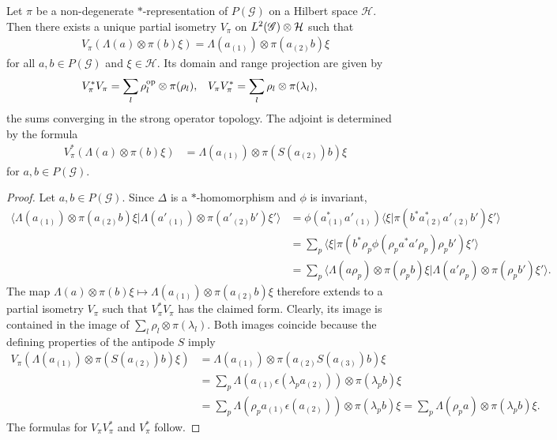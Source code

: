 \begin{Lem} \label{lemma:partial-isometry}
  Let  $\pi$ be a non-degenerate $*$-representation of
  $P(\mathscr{G})$ on a Hilbert space $\mathcal{H}$. Then there exists
  a unique partial isometry $V_{\pi}$ on $L^{2}(\mathscr{G}) \otimes \mathcal{H}$
  such that
  \begin{align*}
    V_{\pi}(\Lambda(a) \otimes \pi(b)\xi) = \Lambda(a_{(1)}) \otimes
    \pi(a_{(2)}b) \xi
  \end{align*}
  for all $a,b\in P(\mathscr{G})$ and $\xi \in \mathcal{H}$. Its
 domain and range projection are given by
\begin{align*}
  V_{\pi}^{*}V_{\pi} &= \sum_{l} \rho_{l}^{\operatorname{\mathrm{op}}} \otimes \pi(\rho_{l}), &
  V_{\pi}V_{\pi}^{*} &= \sum_{l}  \rho_{l} \otimes \pi(\lambda_{l}),
\end{align*}
  the sums converging in the strong operator topology. The adjoint is determined by the formula
\begin{align*}
V_{\pi}^{*}(\Lambda(a) \otimes \pi(b)\xi) &= \Lambda(a_{(1)}) \otimes
\pi(S(a_{(2)})b)\xi
\end{align*}
for $a,b\in P(\mathscr{G})$.
\end{Lem}
\begin{proof}
  Let $a,b \in P(\mathscr{G})$. Since $\Delta$ is a $*$-homomorphism and $\phi$ is
invariant,
  \begin{align*}
    \langle \Lambda(a_{(1)}) \otimes
    \pi(a_{(2)}b)\xi|\Lambda(a'_{(1)}) \otimes
    \pi(a'_{(2)}b')\xi'\rangle &=
    \phi(a_{(1)}^{*}a'_{(1)})\langle \xi|\pi(b^{*}a_{(2)}^{*}a'_{(2)}b')\xi'\rangle \\
    &= \sum_{p}
    \langle \xi|\pi(b^{*}\rho_{p}\phi(\rho_{p}a^{*}a'\rho_{p})\rho_{p}b')\xi'\rangle \\
    & =\sum_{p} \langle\Lambda(a\rho_{p}) \otimes \pi(\rho_{p}b)\xi |
    \Lambda(a'\rho_{p}) \otimes \pi(\rho_{p}b')\xi'\rangle.
  \end{align*}
  The map $\Lambda(a) \otimes \pi(b)\xi \mapsto \Lambda(a_{(1)})
  \otimes \pi(a_{(2)}b)\xi$ therefore extends to a partial isometry
  $V_{\pi}$ such that $V^{*}_{\pi}V_{\pi}$ has the claimed
  form. Clearly, its image is contained in the image of $\sum_{l}
  \rho_{l} \otimes \pi(\lambda_{l})$. Both images coincide
  because the defining properties of the antipode $S$
  imply 
 \begin{align*}
 V_{\pi}(\Lambda(a_{(1)}) \otimes \pi(S(a_{(2)})b)\xi)   &=
 \Lambda(a_{(1)}) \otimes \pi(a_{(2)}S(a_{(3)})b)\xi \\ &=  \sum_{p}\Lambda(a_{(1)}\epsilon(\lambda_p a_{(2)})) \otimes \pi(\lambda_{p}b)\xi   \\
 &= \sum_{p}\Lambda(\rho_{p}a_{(1)}\epsilon(a_{(2)})) \otimes \pi(\lambda_{p}b) \xi
 = \sum_{p} \Lambda(\rho_{p}a) \otimes \pi(\lambda_{p}b)\xi.
 \end{align*}
The formulas for $V_{\pi}V_{\pi}^{*}$ and $V_{\pi}^{*}$ follow.
\end{proof}
